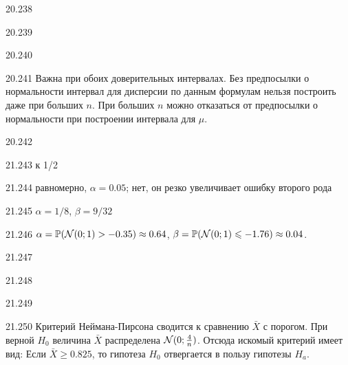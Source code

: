 \protect \hypertarget {soln:20.238}{}
\begin{solution}{{20.238}}
\end{solution}
\protect \hypertarget {soln:20.239}{}
\begin{solution}{{20.239}}
\end{solution}
\protect \hypertarget {soln:20.240}{}
\begin{solution}{{20.240}}
\end{solution}
\protect \hypertarget {soln:20.241}{}
\begin{solution}{{20.241}}
Важна при обоих доверительных интервалах. Без предпосылки о нормальности интервал для дисперсии по данным формулам нельзя построить даже при больших $n$. При больших $n$ можно отказаться от предпосылки о нормальности при построении интервала для $\mu$.
\end{solution}
\protect \hypertarget {soln:20.242}{}
\begin{solution}{{20.242}}
\end{solution}
\protect \hypertarget {soln:21.243}{}
\begin{solution}{{21.243}}
к 1/2
\end{solution}
\protect \hypertarget {soln:21.244}{}
\begin{solution}{{21.244}}
  равномерно, $\alpha=0.05$; нет, он резко увеличивает ошибку второго рода
\end{solution}
\protect \hypertarget {soln:21.245}{}
\begin{solution}{{21.245}}
  $\alpha = 1/8$, $\beta = 9/32$
\end{solution}
\protect \hypertarget {soln:21.246}{}
\begin{solution}{{21.246}}
  $\alpha = \mathbb{P}(\mathcal{N}(0;1) > -0.35) \approx 0.64$, $\beta = \mathbb{P}(\mathcal{N}(0;1) \leqslant -1.76) \approx 0.04$.
\end{solution}
\protect \hypertarget {soln:21.247}{}
\begin{solution}{{21.247}}
\end{solution}
\protect \hypertarget {soln:21.248}{}
\begin{solution}{{21.248}}
\end{solution}
\protect \hypertarget {soln:21.249}{}
\begin{solution}{{21.249}}

\end{solution}
\protect \hypertarget {soln:21.250}{}
\begin{solution}{{21.250}}
Критерий Неймана-Пирсона сводится к сравнению $\bar X$ с порогом. При верной $H_0$ величина $\bar X$ распределена $\mathcal{N}(0; \frac{4}{n})$.
Отсюда искомый критерий имеет вид:
Если $\bar X  \geqslant 0.825$, то гипотеза ${H_0}$ отвергается в пользу гипотезы ${H_a}$.
\end{solution}
